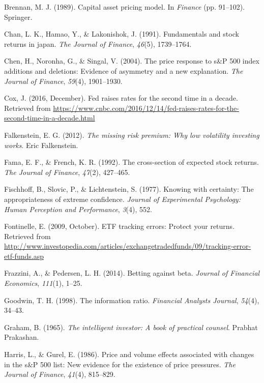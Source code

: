 \documentclass[12pt,twoside]{reedthesis}
\theoremstyle{definition}
\theoremstyle{definition}
\theoremstyle{definition}
\theoremstyle{remark}
\begin{document}
\hypertarget{ref-brennan1989}{}
Brennan, M. J. (1989). Capital asset pricing model. In \emph{Finance}
(pp. 91--102). Springer.

\hypertarget{ref-chan1991}{}
Chan, L. K., Hamao, Y., \& Lakonishok, J. (1991). Fundamentals and stock
returns in japan. \emph{The Journal of Finance}, \emph{46}(5),
1739--1764.

\hypertarget{ref-chen2004}{}
Chen, H., Noronha, G., \& Singal, V. (2004). The price response to s\&P
500 index additions and deletions: Evidence of asymmetry and a new
explanation. \emph{The Journal of Finance}, \emph{59}(4), 1901--1930.

\hypertarget{ref-cox2016}{}
Cox, J. (2016, December). Fed raises rates for the second time in a
decade. Retrieved from
\url{https://www.cnbc.com/2016/12/14/fed-raises-rates-for-the-second-time-in-a-decade.html}

\hypertarget{ref-falkenstein2012}{}
Falkenstein, E. G. (2012). \emph{The missing risk premium: Why low
volatility investing works}. Eric Falkenstein.

\hypertarget{ref-fama1992}{}
Fama, E. F., \& French, K. R. (1992). The cross-section of expected
stock returns. \emph{The Journal of Finance}, \emph{47}(2), 427--465.

\hypertarget{ref-fischhoff1977}{}
Fischhoff, B., Slovic, P., \& Lichtenstein, S. (1977). Knowing with
certainty: The appropriateness of extreme confidence. \emph{Journal of
Experimental Psychology: Human Perception and Performance}, \emph{3}(4),
552.

\hypertarget{ref-fontinelle2009}{}
Fontinelle, E. (2009, October). ETF tracking errors: Protect your
returns. Retrieved from
\url{http://www.investopedia.com/articles/exchangetradedfunds/09/tracking-error-etf-funds.asp}

\hypertarget{ref-frazzini2014}{}
Frazzini, A., \& Pedersen, L. H. (2014). Betting against beta.
\emph{Journal of Financial Economics}, \emph{111}(1), 1--25.

\hypertarget{ref-goodwin1998}{}
Goodwin, T. H. (1998). The information ratio. \emph{Financial Analysts
Journal}, \emph{54}(4), 34--43.

\hypertarget{ref-graham1965}{}
Graham, B. (1965). \emph{The intelligent investor: A book of practical
counsel}. Prabhat Prakashan.

\hypertarget{ref-harris1986}{}
Harris, L., \& Gurel, E. (1986). Price and volume effects associated
with changes in the s\&P 500 list: New evidence for the existence of
price pressures. \emph{The Journal of Finance}, \emph{41}(4), 815--829.
\end{document}
